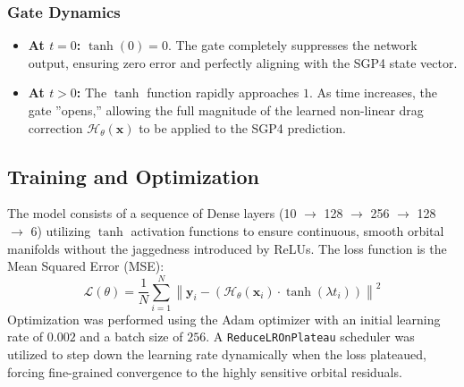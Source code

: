 \subsubsection{Gate Dynamics}
\begin{itemize}
    \item \textbf{At $t = 0$:} $\tanh(0) = 0$. The gate completely suppresses the network output, ensuring zero error and perfectly aligning with the SGP4 state vector.
    \item \textbf{At $t > 0$:} The $\tanh$ function rapidly approaches $1$. As time increases, the gate ''opens,'' allowing the full magnitude of the learned non-linear drag correction $\mathcal{H}_\theta(\mathbf{x})$ to be applied to the SGP4 prediction.
\end{itemize}

\subsection{Training and Optimization}
The model consists of a sequence of Dense layers (10 $\rightarrow$ 128 $\rightarrow$ 256 $\rightarrow$ 128 $\rightarrow$ 6) utilizing $\tanh$ activation functions to ensure continuous, smooth orbital manifolds without the jaggedness introduced by ReLUs.
The loss function is the Mean Squared Error (MSE):
\begin{equation}
    \mathcal{L}(\theta) = \frac{1}{N} \sum_{i=1}^{N} \left\| \mathbf{y}_i - \left( \mathcal{H}_\theta(\mathbf{x}_i) \cdot \tanh(\lambda t_i) \right) \right\|^2
\end{equation}
Optimization was performed using the Adam optimizer with an initial learning rate of $0.002$ and a batch size of $256$. A \texttt{ReduceLROnPlateau} scheduler was utilized to step down the learning rate dynamically when the loss plateaued, forcing fine-grained convergence to the highly sensitive orbital residuals.

